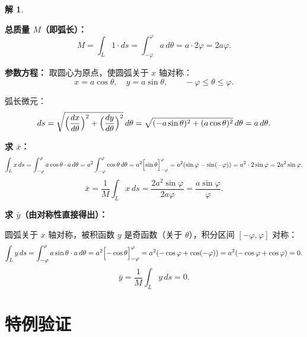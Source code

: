 \documentclass[12pt,a4paper]{ctexart}
\theoremstyle{myremark}
\newtheorem*{remark}{解}
\newcommand{\answerbox}[1]{%
  \begin{center}
  \fbox{\color{red}\large\bfseries #1}
  \end{center}
}
\begin{document}
\begin{remark}
  ~
\end{remark}

\medskip

\noindent\textbf{总质量 $M$（即弧长）：}
\[
M = \int_L 1 \cdot ds = \int_{-\varphi}^{\varphi} a \, d\theta
    = a \cdot 2\varphi = 2a\varphi.
\]

\medskip

\noindent\textbf{参数方程：} 取圆心为原点，使圆弧关于 $x$ 轴对称：
\[
x = a\cos\theta,\quad y = a\sin\theta,\qquad -\varphi \leq \theta \leq \varphi.
\]

弧长微元：
\[
ds = \sqrt{\Bigl(\frac{dx}{d\theta}\Bigr)^2 + \Bigl(\frac{dy}{d\theta}\Bigr)^2}\, d\theta
    = \sqrt{(-a\sin\theta)^2 + (a\cos\theta)^2}\, d\theta
    = a\, d\theta.
\]

\medskip

\noindent\textbf{求 $\bar{x}$：}
\[
\int_L x \, ds = \int_{-\varphi}^{\varphi} a\cos\theta \cdot a\, d\theta
                = a^2 \int_{-\varphi}^{\varphi} \cos\theta\, d\theta
                = a^2 \Bigl[\sin\theta\Bigr]_{-\varphi}^{\varphi}
                = a^2 (\sin\varphi - \sin(-\varphi))
                = a^2 \cdot 2\sin\varphi
                = 2a^2 \sin\varphi.
\]
\[
\bar{x} = \frac{1}{M} \int_L x \, ds
        = \frac{2a^2 \sin\varphi}{2a\varphi}
        = \frac{a \sin\varphi}{\varphi}.
\]

\medskip

\noindent\textbf{求 $\bar{y}$（由对称性直接得出）：}

圆弧关于 $x$ 轴对称，被积函数 $y$ 是奇函数（关于 $\theta$），积分区间 $[-\varphi,\varphi]$ 对称：
\[
\int_L y \, ds = \int_{-\varphi}^{\varphi} a\sin\theta \cdot a\, d\theta
                = a^2 \Bigl[-\cos\theta\Bigr]_{-\varphi}^{\varphi}
                = a^2 (-\cos\varphi + \cos(-\varphi))
                = a^2 (-\cos\varphi + \cos\varphi)
                = 0.
\]
\[
\bar{y} = \frac{1}{M} \int_L y \, ds = 0.
\]

\bigskip

\answerbox{$\displaystyle \bar{x} = \frac{a\sin\varphi}{\varphi},\qquad \bar{y} = 0$}

\bigskip

\section*{特例验证}
\end{document}
